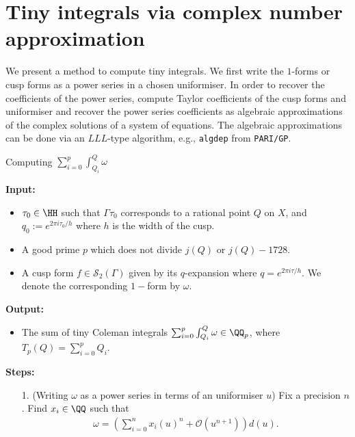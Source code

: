 \section{Tiny integrals via complex number approximation}

We present a method to compute tiny integrals. We first write the $1$-forms or cusp forms as a power series in a chosen uniformiser. In order to recover the coefficients of the power series, compute Taylor coefficients of the cusp forms and uniformiser and recover the power series coefficients as algebraic approximations of the complex solutions of a system of equations. The algebraic approximations can be done via an $LLL$-type algorithm, e.g., \texttt{algdep} from \texttt{PARI/GP}.

\begin{algorithm}Computing $\sum_{i=0}^{p}\int^Q_{Q_i} \omega$\label{alg:tiny_integral}

\textbf{Input:}
\begin{itemize}
    \item $\tau_0 \in \HH$ such that $\Gamma\tau_0$ corresponds to a rational point $Q$ on $X$, and $q_0 := e^{2\pi i \tau_0/h}$ where $h$ is the width of the cusp.
    \item A good prime $p$ which does not divide $j(Q)$ or $j(Q)-1728$. 
    \item A cusp form $f\in \mathcal{S}_2(\Gamma)$ given by its $q$-expansion where $q = e^{2\pi i \tau/h}$. We denote the corresponding $1-$form by $\omega$.


\end{itemize}

\textbf{Output:}
\begin{itemize}
    \item The sum of tiny Coleman integrals $\sum^p_{i=0}\int^Q_{Q_i} \omega \in \QQ_p$, where $T_p(Q) = \sum_{i=0}^p Q_i$.
\end{itemize}

\textbf{Steps:}
\begin{enumerate}
\item[1.] \label{algstep:tiny_1} (Writing $\omega$ as a power series in terms of an uniformiser $u$) Fix a precision $n$. Find $x_i \in \QQ$ such that
\begin{align} \label{eq:omega_j_exp}
    \omega = (\sum_{i=0}^n x_i(u)^n + \mathcal{O}(u^{n+1}))d(u).
\end{align}


\end{enumerate}
\end{algorithm}
